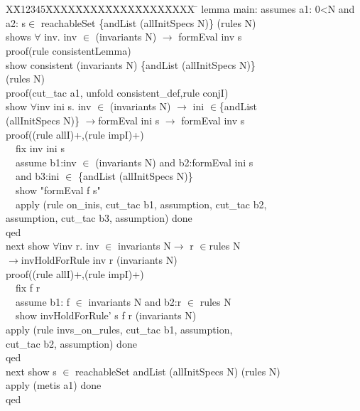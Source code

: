 \documentclass[final]{IEEEtran}
\newlength{\fminilength}
\newenvironment{fmini}[1][\linewidth]
  {\setlength{\fminilength}{#1\fboxsep-2\fboxrule}%
   \vspace{2ex}\noindent\begin{lrbox}{\fminibox}\begin{minipage}{\fminilength}%
   \mbox{ }\hfill\vspace{-2.5ex}}%
  {\end{minipage}\end{lrbox}\vspace{1ex}\hspace{0ex}%
   \framebox{\usebox{\fminibox}}}
\newenvironment{specification}
{\noindent\scriptsize
\tt\begin{fmini}\begin{tabbing}X\=X12345\=XXXX\=XXXX\=XXXX\=XXXX\=XXXX
\=\+\kill} {\end{tabbing}\normalfont\end{fmini}}
\def \twoSpaces {\ \ }
\begin{document}
\begin{specification}
lemma main:
  assumes  a1: 0<N and \\
  a2: s$\in$ reachableSet \{andList (allInitSpecs N)\} (rules N)\\
  shows $\forall$ inv. inv $\in$ (invariants N) $\longrightarrow$ formEval inv s\\
proof(rule consistentLemma)\\
  show consistent (invariants N) \{andList (allInitSpecs N)\}\\ (rules N)\\
 proof(cut\_tac a1, unfold consistent\_def,rule conjI)\\
   show  $\forall$inv ini s. inv $\in$ (invariants N)
$\longrightarrow$ ini $\in$\{andList \\
(allInitSpecs N)\} $\longrightarrow$formEval ini s $\longrightarrow$ formEval inv s\\
proof((rule allI)+,(rule impI)+)\\
\twoSpaces   fix inv ini s\\
\twoSpaces   assume b1:inv $\in$ (invariants N) and b2:formEval ini s\\
\twoSpaces     and b3:ini $\in$ \{andList (allInitSpecs N)\}  \\
\twoSpaces   show "formEval f s"\\
\twoSpaces   apply (rule on\_inis, cut\_tac b1, assumption, cut\_tac b2, \\
assumption, cut\_tac b3, assumption) done\\
    qed\\

next   show  $\forall$inv r. inv $\in$ invariants N$\longrightarrow$
 r $\in$rules N\\
 $\longrightarrow$invHoldForRule inv r (invariants N) \\

   proof((rule allI)+,(rule impI)+)\\
\twoSpaces      fix f r \\
\twoSpaces         assume b1: f $\in$ invariants N  and b2:r $\in$ rules N\\

\twoSpaces     show invHoldForRule' s f r (invariants N)\\
  apply (rule invs\_on\_rules, cut\_tac b1, assumption, \\
  cut\_tac b2, assumption) done\\
qed\\
next show s $\in$ reachableSet {andList (allInitSpecs N)} (rules N)\\
  apply (metis a1) done\\
qed\\
\end{specification}
\end{document}
